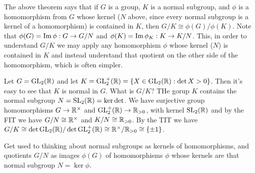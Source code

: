 The above theorem says that if $G$ is a group, $K$ is a normal subgroup, and $\phi$ is a
homomorphism from $G$ whose kernel ($N$ above, since every normal subgroup is a kernel of
a homomorphism) is contained in $K$, then $G/K \cong \phi(G)/\phi(K)$. Note that
$\phi(G)=\operatorname{Im} \phi:G\to G/N$ and $\phi(K)=\operatorname{Im} \phi_{K}:K\to K/N$. This, in order to
understand $G/K$ we may apply any homomorphism $\phi$ whose kernel ($N$) is contained in
$K$ and instead understand that quotient on the other side of the homomorphism, which is
often simpler.

\begin{example}
  Let $G=\operatorname{GL}_{2}(\mathbb R)$ and let $K=\operatorname{GL}_2^+(\mathbb R)=\{X\in\operatorname{GL}_2(\mathbb R) : \det X>0\}$. Then it's
  easy to see that $K$ is normal in $G$. What is $G/K$? THe gorup $K$ contains the normal
  subgroup $N=\operatorname{SL}_2(\mathbb R)=\ker\det$. We have surjective group homomorphisms
  $G\to\mathbb R^{\times}$ and $\operatorname{GL}_2^+(\mathbb R)\to\mathbb R_{>0}$, with kernel $\operatorname{SL}_2(\mathbb R)$ and by the
  FIT we have $G/N\cong \mathbb R^{\times}$ and $K/N\cong \mathbb R_{>0}$. By the TIT we have
  $G/K\cong \det\operatorname{GL}_2(\mathbb R)/\det\operatorname{GL}_2^+(\mathbb R)\cong \mathbb R^{\times}/\mathbb R_{>0}\cong \{\pm 1\}$.
\end{example}

Get used to thinking about normal subgroups as kernels of homomorphisms, and quotients
$G/N$ as images $\phi(G)$ of homomorphisms $\phi$ whose kernels are that normal subgroup
$N=\ker\phi$.
